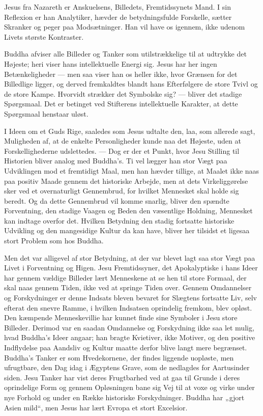 \documentclass[12pt,a4paper,openany]{book}
\newcommand{\opage}[1]{\marginnote{\footnotesize\textit{[#1]}}}
\begin{document}
Jesus fra Nazareth er Anskuelsens, Billedets, Fremtidssynets Mand. I sin
Reflexion er han Analytiker, hævder de betydningsfulde Forskelle, sætter
Skranker og peger paa Modsætninger. Han
\opage{200}vil have os igennem, ikke udenom Livets største Kontraster.

Buddha afviser alle Billeder og Tanker som utilstrækkelige til at
udtrykke det Højeste; heri viser hans intellektuelle Energi sig. Jesus
har her ingen Betænkeligheder --- men saa viser han os heller ikke, hvor
Grænsen for det Billedlige ligger, og derved fremkaldtes blandt hans
Efterfølgere de store Tvivl og de store Kampe. Hvorvidt strækker det
Symbolske sig? --- bliver det stadige Spørgsmaal. Det er betinget ved
Stifterens intellektuelle Karakter, at dette Spørgsmaal henstaar uløst.

I Ideen om et Guds Rige, saaledes som Jesus udtalte den, laa, som
allerede sagt, Muligheden af, at de enkelte Personligheder kunde naa det
Højeste, uden at Forskellighederne udslettedes. --- Dog er der et Punkt,
hvor Jesu Stilling til Historien bliver analog med Buddha’s. Ti vel
lægger han stor Vægt paa Udviklingen mod et fremtidigt Maal, men han
hævder tillige, at Maalet ikke naas paa positiv Maade gennem det
historiske Arbejde, men at dets Virkeliggørelse sker ved et
overnaturligt Gennembrud, for hvilket Mennesket skal holde sig beredt.
Og da dette Gennembrud vil komme snarlig, bliver den spændte
Forventning, den stadige Vaagen og Beden den væsentlige Holdning,
Mennesket kan indtage overfor det. Hvilken Betydning den stadig
fortsatte historiske Udvikling og den mangesidige Kultur da kan have,
bliver her tilsidst et ligesaa stort Problem som hos Buddha.

Men det var alligevel af stor Betydning, at der var blevet lagt saa stor
Vægt paa Livet i Forventning og Higen. Jesu Fremtidssyner, det
Apokalyptiske i hans Ideer har gennem vældige Billeder lært Menneskene
at se hen til store Formaal, der skal naas gennem Tiden, ikke ved at
springe Tiden over. Gennem Omdannelser og Forskydninger er denne Indsats
bleven bevaret for Slægtens fortsatte Liv, selv efterat den snevre
Ramme, i hvilken Indsatsen oprindelig fremkom, blev opløst. Den kæmpende
Menneskevillie har kunnet finde sine Symboler i Jesu store Billeder.
Derimod var en saadan Omdannelse og Forskydning ikke saa let mulig, hvad
Buddha’s Ideer angaar; han bragte Kvietiver, ikke Motiver, og den
positive Indflydelse paa Aandsliv og Kultur maatte derfor blive langt
mere begrænset. Buddha’s Tanker er som Hvedekornene, der findes liggende
uopløste, men ufrugtbare, den Dag idag i Ægyptens Grave, som de
nedlagdes for Aartusinder siden. Jesu Tanker har vist deres Frugtbarhed
ved at gaa til Grunde i deres oprindelige Form og gennem Opløsningen
bane
\opage{201}sig Vej til at voxe og virke under nye Forhold og under en
Række historiske Forskydninger. Buddha har „gjort Asien mild“, men Jesus
har lært Evropa et stort Excelsior.
\end{document}
